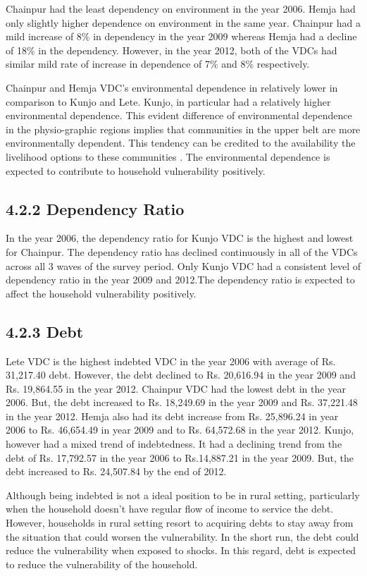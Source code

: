 \documentclass[12pt, a4paper]{article}
\begin{document}
Chainpur had the least dependency on environment in the year 2006. Hemja had only slightly higher dependence on environment in the same year. Chainpur had a mild increase of 8\% in dependency in the year 2009 whereas Hemja had a decline of 18\% in the dependency. However, in the year 2012, both of the VDCs had similar mild rate of increase in dependence of 7\% and 8\% respectively.

Chainpur and Hemja VDC's environmental dependence in relatively lower in comparison to Kunjo and Lete. Kunjo, in particular had a relatively higher environmental dependence. This evident difference of environmental dependence in the physio-graphic regions implies that communities in the upper belt are more environmentally dependent. This tendency can be credited to the availability the livelihood options to these communities \citep{rayamajhi2012empirical, larsen2014role}. The environmental dependence is expected to contribute to household vulnerability positively.           
\subsection*{4.2.2 Dependency Ratio}
In the year 2006, the dependency ratio for Kunjo VDC is the highest and lowest for Chainpur. The dependency ratio has declined continuously in all of the VDCs across all 3 waves of the survey period. Only Kunjo VDC had a consistent level of dependency ratio in the year 2009 and 2012.The dependency ratio is expected to affect the household vulnerability positively. 

\subsection*{4.2.3 Debt}
Lete VDC is the highest indebted VDC in the year 2006 with average of Rs. 31,217.40 debt. However, the debt declined to Rs. 20,616.94 in the year 2009 and Rs. 19,864.55 in the year 2012. Chainpur VDC had the lowest debt in the year 2006. But, the debt increased to Rs. 18,249.69 in the year 2009 and Rs. 37,221.48 in the year 2012. Hemja also had its debt increase from Rs. 25,896.24 in year 2006 to Rs. 46,654.49 in year 2009 and to Rs. 64,572.68 in the year 2012. Kunjo, however had a mixed trend of indebtedness. It had a declining trend from the debt of Rs. 17,792.57 in the year 2006 to Rs.14,887.21 in the year 2009. But, the debt increased to Rs. 24,507.84 by the end of 2012.

Although being indebted is not a ideal position to be in rural setting, particularly when the household doesn't have regular flow of income to service the debt. However, households in rural setting resort to acquiring debts to stay away from the situation that could worsen the vulnerability. In the short run, the debt could reduce the vulnerability when exposed to shocks. In this regard, debt is expected to reduce the vulnerability of the household.   
\end{document}
